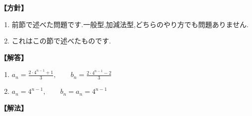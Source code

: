 \noindent\textbf{【方針】}
\begin{enumerate}[label=(\arabic*),parsep=3pt]
  \item 前節で述べた問題です.一般型,加減法型,どちらのやり方でも問題ありません.
  \item これはこの節で述べたものです.
\end{enumerate}

\noindent\textbf{【解答】}
\begin{enumerate}[label=(\arabic*),parsep=3pt]
  \item $\displaystyle a_n=\frac{2\cdot4^{n-1}+1}{3},\qquad b_n=\frac{2\cdot4^{n-1}-2}{3}$
  \item $\displaystyle a_n=4^{n-1},\qquad b_n=a_n=4^{n-1}$
\end{enumerate}

\noindent\textbf{【解法】}

